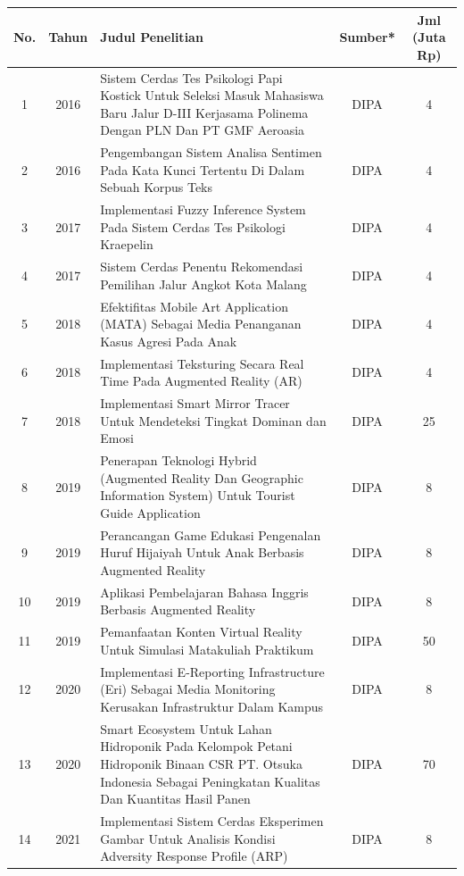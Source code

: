 {\footnotesize
\begin{longtable}{|c|c|p{6cm}|c|c|}
\hline
\textbf{No.} & \textbf{Tahun} & \textbf{Judul Penelitian} & \textbf{Sumber*} & \textbf{Jml (Juta Rp)} \\
\hline
1 & 2016 & Sistem Cerdas Tes Psikologi Papi Kostick Untuk Seleksi Masuk Mahasiswa Baru Jalur D-III Kerjasama Polinema Dengan PLN Dan PT GMF Aeroasia & DIPA & 4 \\
\hline
2 & 2016 & Pengembangan Sistem Analisa Sentimen Pada Kata Kunci Tertentu Di Dalam Sebuah Korpus Teks & DIPA & 4 \\
\hline
3 & 2017 & Implementasi Fuzzy Inference System Pada Sistem Cerdas Tes Psikologi Kraepelin & DIPA & 4 \\
\hline
4 & 2017 & Sistem Cerdas Penentu Rekomendasi Pemilihan Jalur Angkot Kota Malang & DIPA & 4 \\
\hline
5 & 2018 & Efektifitas Mobile Art Application (MATA) Sebagai Media Penanganan Kasus Agresi Pada Anak & DIPA & 4 \\
\hline
6 & 2018 & Implementasi Teksturing Secara Real Time Pada Augmented Reality (AR) & DIPA & 4 \\
\hline
7 & 2018 & Implementasi Smart Mirror Tracer Untuk Mendeteksi Tingkat Dominan dan Emosi & DIPA & 25 \\
\hline
8 & 2019 & Penerapan Teknologi Hybrid (Augmented Reality Dan Geographic Information System) Untuk Tourist Guide Application & DIPA & 8 \\
\hline
9 & 2019 & Perancangan Game Edukasi Pengenalan Huruf Hijaiyah Untuk Anak Berbasis Augmented Reality & DIPA & 8 \\
\hline
10 & 2019 & Aplikasi Pembelajaran Bahasa Inggris Berbasis Augmented Reality & DIPA & 8 \\
\hline
11 & 2019 & Pemanfaatan Konten Virtual Reality Untuk Simulasi Matakuliah Praktikum & DIPA & 50 \\
\hline
12 & 2020 & Implementasi E-Reporting Infrastructure (Eri) Sebagai Media Monitoring Kerusakan Infrastruktur Dalam Kampus & DIPA & 8 \\
\hline
13 & 2020 & Smart Ecosystem Untuk Lahan Hidroponik Pada Kelompok Petani Hidroponik Binaan CSR PT. Otsuka Indonesia Sebagai Peningkatan Kualitas Dan Kuantitas Hasil Panen & DIPA & 70 \\
\hline
14 & 2021 & Implementasi Sistem Cerdas Eksperimen Gambar Untuk Analisis Kondisi Adversity Response Profile (ARP) & DIPA & 8 \\
\hline
\end{longtable}
}

